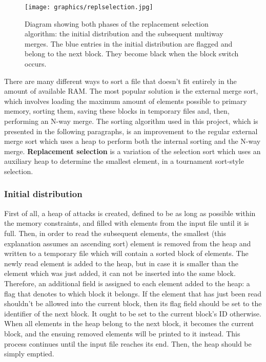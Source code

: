 \documentclass[10pt,a4paper]{article}
\numberwithin{equation}{section}
\begin{document}
\begin{figure}[H]
    \centering
    \texttt{[image: graphics/replselection.jpg]}
    \caption{Diagram showing both phases of the replacement selection algorithm: the initial distribution and the subsequent multiway merges. The blue entries in the initial distribution are flagged and belong to the next block. They become black when the block switch occurs.}
    \label{fig:replselection}
\end{figure}

There are many different ways to sort a file that doesn't fit entirely in the amount of available RAM. The most popular solution is the external merge sort, which involves loading the maximum amount of elements possible to primary memory, sorting them, saving these blocks in temporary files and, then, performing an N-way merge. The sorting algorithm used in this project, which is presented in the following paragraphs, is an improvement to the regular external merge sort which uses a heap to perform both the internal sorting and the N-way merge. \textbf{Replacement selection} is a variation of the selection sort which uses an auxiliary heap to determine the smallest element, in a tournament sort-style selection.

\subsubsection{Initial distribution}

First of all, a heap of attacks is created, defined to be as long as possible within the memory constraints, and filled with elements from the input file until it is full. Then, in order to read the subsequent elements, the smallest (this explanation assumes an ascending sort) element is removed from the heap and written to a temporary file which will contain a sorted block of elements. The newly read element is added to the heap, but in case it is smaller than the element which was just added, it can not be inserted into the same block. Therefore, an additional field is assigned to each element added to the heap: a flag that denotes to which block it belongs. If the element that has just been read shouldn't be allowed into the current block, then its flag field should be set to the identifier of the next block. It ought to be set to the current block's ID otherwise. When all elements in the heap belong to the next block, it becomes the current block, and the ensuing removed elements will be printed to it instead. This process continues until the input file reaches its end. Then, the heap should be simply emptied.
\end{document}

